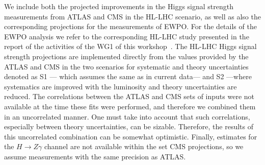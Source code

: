 We include both the projected improvements 
in the Higgs signal strength measurements from ATLAS and CMS in the HL-LHC scenario,
as well as also the corresponding projections for the measurements of EWPO.
For the details of the EWPO analysis we refer to the corresponding HL-LHC study 
presented in the report of the activities of the WG1 of this workshop~\cite{Azzi:2650160}.
%
The HL-LHC Higgs signal strength projections are implemented directly from the values
provided by the ATLAS and CMS in the two scenarios for systematic and theory uncertainties
denoted as S1 --- which assumes the same as in current data--- and S2 ---where systematics
are improved with the luminosity and theory uncertainties are reduced.
%
The correlations between the ATLAS and CMS sets of inputs were not available at the time
these fits were performed, and therefore we combined them in an uncorrelated manner. One must take into 
account that such correlations, especially between theory uncertainties, can be sizable. Therefore,
the results of this uncorrelated combination can be somewhat optimistic.
Finally, estimates for the $H\to Z\gamma$ channel are not available within the set CMS projections, so we 
assume measurements with the same precision as ATLAS.

